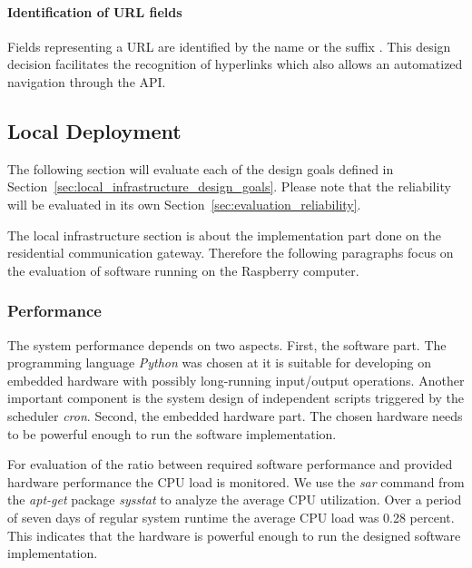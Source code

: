 \paragraph{Identification of URL fields}

Fields representing a URL are identified by the name  or the suffix .
This design decision facilitates the recognition of hyperlinks which also allows an automatized navigation through the API.



\subsection{Local Deployment}



The following section will evaluate each of the design goals defined in Section~\ref{sec:local_infrastructure_design_goals}.
Please note that the reliability will be evaluated in its own Section~\ref{sec:evaluation_reliability}.

The local infrastructure section is about the implementation part done on the residential communication gateway.
Therefore the following paragraphs focus on the evaluation of software running on the Raspberry computer.

\subsubsection{Performance}

The system performance depends on two aspects.
First, the software part.
The programming language \emph{Python} was chosen at it is suitable for developing on embedded hardware with possibly long-running input/output operations.
Another important component is the system design of independent scripts triggered by the scheduler \emph{cron}.
Second, the embedded hardware part.
The chosen hardware needs to be powerful enough to run the software implementation.

For evaluation of the ratio between required software performance and provided hardware performance the CPU load is monitored.
We use the \emph{sar} command from the \emph{apt-get} package \emph{sysstat} to analyze the average CPU utilization.
Over a period of seven days of regular system runtime the average CPU load was 0.28 percent.
This indicates that the hardware is powerful enough to run the designed software implementation.


